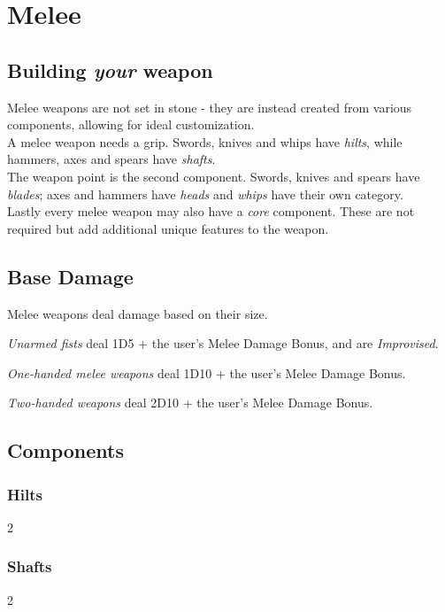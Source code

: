 \section{Melee}
\subsection{Building \emph{your} weapon}
Melee weapons are not set in stone - they are instead created from various components, allowing for ideal customization.\\
A melee weapon needs a grip. Swords, knives and whips have \emph{hilts}, while hammers, axes and spears have \emph{shafts}.\\
The weapon point is the second component. Swords, knives and spears have \emph{blades}; axes and hammers have \emph{heads} and \emph{whips} have their own category.\\
Lastly every melee weapon may also have a \emph{core} component.
These are not required but add additional unique features to the weapon.
\subsection{Base Damage}
Melee weapons deal damage based on their size.
\begin{sitemize}
	\item \emph{Unarmed fists} deal 1D5 + the user's Melee Damage Bonus, and are \emph{Improvised}.
	\item \emph{One-handed melee weapons} deal 1D10 + the user's Melee Damage Bonus.
	\item \emph{Two-handed weapons} deal 2D10 + the user's Melee Damage Bonus.
\end{sitemize}
\subsection{Components}
\subsubsection{Hilts}
\vspace{8mm}
\begin{multicols}{2}
\end{multicols}

\subsubsection{Shafts}
\vspace{8mm}
\begin{multicols}{2}
\end{multicols}


